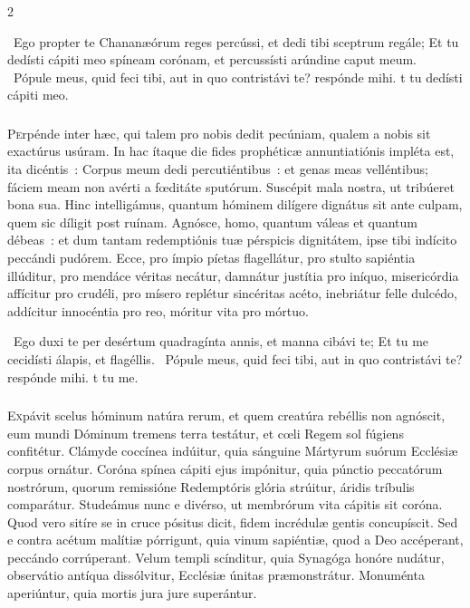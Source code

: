 \documentclass[9pt,twoside]{extarticle}
\begin{document}
\begin{multicols}{2}
\begin{tightlist}{}
\item {}~Ego propter te Chananæórum reges percússi, et dedi tibi sceptrum regále; \textred{*} Et tu dedísti cápiti meo spíneam corónam, et percussísti arúndine caput meum. ~Pópule meus, quid feci tibi, aut in quo contristávi te? respónde mihi. t tu dedísti cápiti meo.
\end{tightlist}

\subsubsection*{\center{}}
\lettrine{P}erpénde inter hæc, qui talem pro nobis dedit pecúniam, qualem a nobis sit exactúrus usúram. In hac ítaque die fides prophéticæ annuntiatiónis impléta est, ita dicéntis~: Corpus meum dedi percutiéntibus~: et genas meas velléntibus; fáciem meam non avérti a fœditáte sputórum. Suscépit mala nostra, ut tribúeret bona sua. Hinc intelligámus, quantum hóminem dilígere dignátus sit ante culpam, quem sic díligit post ruínam. Agnósce, homo, quantum váleas et quantum débeas~: et dum tantam redemptiónis tuæ pérspicis dignitátem, ipse tibi indícito peccándi pudórem. Ecce, pro ímpio píetas flagellátur, pro stulto sapiéntia illúditur, pro mendáce véritas necátur, damnátur justítia pro iníquo, misericórdia affícitur pro crudéli, pro mísero replétur sincéritas acéto, inebriátur felle dulcédo, addícitur innocéntia pro reo, móritur vita pro mórtuo.

\begin{tightlist}{}
\item {}~Ego duxi te per desértum quadragínta annis, et manna cibávi te; \textred{*} Et tu me cecidísti álapis, et flagéllis. ~Pópule meus, quid feci tibi, aut in quo contristávi te? respónde mihi. t tu me.
\end{tightlist}

\subsubsection*{\center{}}
\lettrine{E}xpávit scelus hóminum natúra rerum, et quem creatúra rebéllis non agnóscit, eum mundi Dóminum tremens terra testátur, et cœli Regem sol fúgiens confitétur. Clámyde coccínea indúitur, quia sánguine Mártyrum suórum Ecclésiæ corpus ornátur. Coróna spínea cápiti ejus impónitur, quia púnctio peccatórum nostrórum, quorum remissióne Redemptóris glória strúitur, áridis tríbulis comparátur. Studeámus nunc e divérso, ut membrórum vita cápitis sit coróna. Quod vero sitíre se in cruce pósitus dicit, fidem incrédulæ gentis concupíscit. Sed e contra acétum malítiæ pórrigunt, quia vinum sapiéntiæ, quod a Deo accéperant, peccándo corrúperant. Velum templi scínditur, quia Synagóga honóre nudátur, observátio antíqua dissólvitur, Ecclésiæ únitas præmonstrátur. Monuménta aperiúntur, quia mortis jura jure superántur.


\end{multicols}
\end{document}
